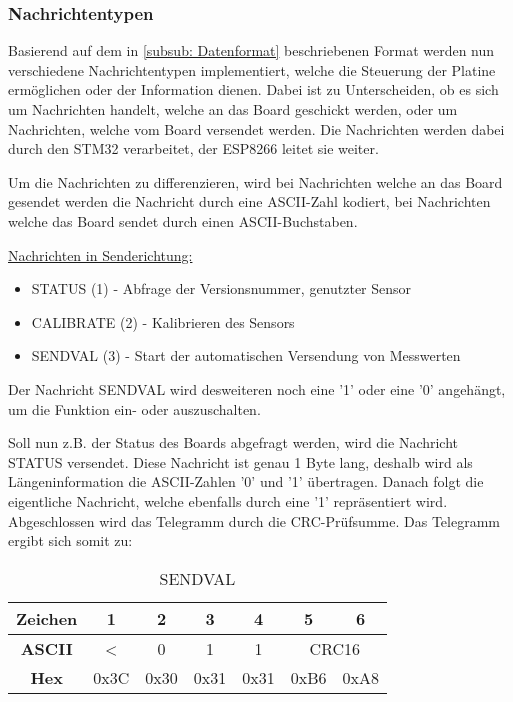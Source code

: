 \subsubsection{Nachrichtentypen}
\label{subsub: Nachricht}

Basierend auf dem in \ref{subsub: Datenformat} beschriebenen Format werden nun verschiedene Nachrichtentypen implementiert, welche die Steuerung
der Platine ermöglichen oder der Information dienen. Dabei ist zu Unterscheiden, ob es sich um Nachrichten handelt, welche an das Board geschickt werden,
oder um Nachrichten, welche vom Board versendet werden.
Die Nachrichten werden dabei durch den STM32 verarbeitet, der ESP8266 leitet sie weiter. 

\smallskip

Um die Nachrichten zu differenzieren, wird bei Nachrichten welche an das Board gesendet werden die Nachricht durch eine \ac{ASCII}-Zahl 
kodiert, bei Nachrichten welche das Board sendet durch einen \ac{ASCII}-Buchstaben.

\smallskip

\underline{Nachrichten in Senderichtung:}
\begin{itemize}
    \item STATUS (1) - Abfrage der Versionsnummer, genutzter Sensor
    \item CALIBRATE (2) - Kalibrieren des Sensors
    \item SENDVAL (3) - Start der automatischen Versendung von Messwerten 
\end{itemize}
Der Nachricht SENDVAL wird desweiteren noch eine '1' oder eine '0' angehängt, um die Funktion ein- oder auszuschalten.

\smallskip

Soll nun z.B. der Status des Boards abgefragt werden, wird die Nachricht STATUS versendet. Diese Nachricht ist genau 1 Byte lang, deshalb
wird als Längeninformation die \ac{ASCII}-Zahlen '0' und '1' übertragen. Danach folgt die eigentliche Nachricht, welche ebenfalls durch eine '1' 
repräsentiert wird. Abgeschlossen wird das Telegramm durch die CRC-Prüfsumme. Das Telegramm ergibt sich somit zu:

\begin{table}[h]
\centering
\begin{tabular}{| c | c | c | c | c | c | c |}
    \hline
    \textbf{Zeichen} & 1 & 2 & 3 & 4 & 5 & 6 \\
    \hline \hline
    \textbf{ASCII} & < & 0 & 1 & 1 & \multicolumn{2}{|c|}{CRC16} \\
    \hline \hline
    \textbf{Hex} & 0x3C & 0x30 & 0x31 & 0x31 & 0xB6 & 0xA8 \\
    \hline
    
\end{tabular}
\caption{SENDVAL}
\end{table}

